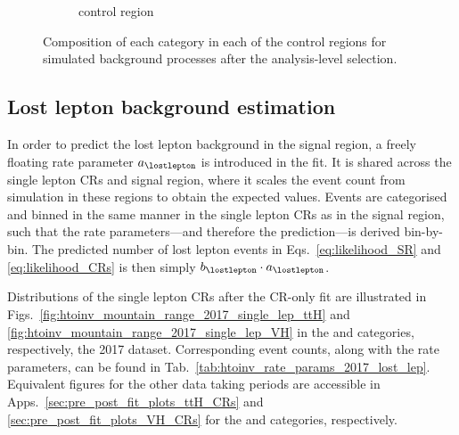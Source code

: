 \begin{figure}[htbp]
\begin{subfigure}[b]{0.3\textwidth}
        \caption{\singlePhotonCr control region}
    \end{subfigure}
    \caption[Composition of each category in each of the control regions for simulated background processes after the analysis-level selection]{Composition of each category in each of the control regions for simulated background processes after the analysis-level selection.}
    \label{fig:htoinv_cr_composition_comb2016to18}
\end{figure}




\subsection{Lost lepton background estimation}
\label{subsubsec:htoinv_lost_lepton_bkg}

In order to predict the lost lepton background in the signal region, a freely floating rate parameter $a_{\lostlepton}$ is introduced in the fit. It is shared across the single lepton \glspl{CR} and signal region, where it scales the event count from simulation in these regions to obtain the expected values. Events are categorised and binned in the same manner in the single lepton \glspl{CR} as in the signal region, such that the rate parameters---and therefore the prediction---is derived bin-by-bin. The predicted number of lost lepton events in Eqs.~\ref{eq:likelihood_SR} and \ref{eq:likelihood_CRs} is then simply $b_{\lostlepton} \cdot a_{\lostlepton}$.

Distributions of the single lepton \glspl{CR} after the \gls{CR}-only fit are illustrated in Figs.~\ref{fig:htoinv_mountain_range_2017_single_lep_ttH} and \ref{fig:htoinv_mountain_range_2017_single_lep_VH} in the \ttH and \VH categories, respectively, the 2017 dataset. Corresponding event counts, along with the rate parameters, can be found in Tab.~\ref{tab:htoinv_rate_params_2017_lost_lep}. Equivalent figures for the other data taking periods are accessible in Apps.~\ref{sec:pre_post_fit_plots_ttH_CRs} and \ref{sec:pre_post_fit_plots_VH_CRs} for the \ttH and \VH categories, respectively.


